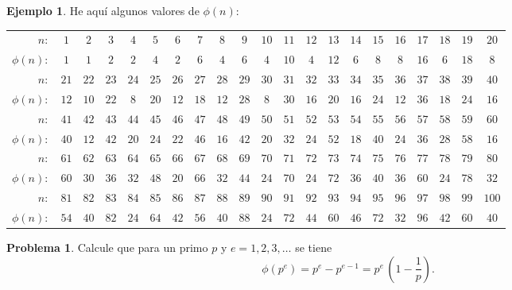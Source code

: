\documentclass{article}
\theoremstyle{definition}
\newtheorem{problema}{Problema}[section]
\newtheorem*{ejemplo}{Ejemplo}
\begin{document}
\begin{ejemplo}
  He aquí algunos valores de $\phi (n)$:

  \begin{center}
    \begin{tabular}{rcccccccccccccccccccc}
      \hline
      $n\colon$ & $1$& $2$& $3$& $4$& $5$& $6$& $7$& $8$& $9$& $10$& $11$& $12$& $13$& $14$& $15$& $16$& $17$& $18$& $19$& $20$ \\
      $\phi(n)\colon$ & $1$& $1$& $2$& $2$& $4$& $2$& $6$& $4$& $6$& $4$& $10$& $4$& $12$& $6$& $8$& $8$& $16$& $6$& $18$& $8$ \\
      \hline
      $n\colon$ & $21$& $22$& $23$& $24$& $25$& $26$& $27$& $28$& $29$& $30$& $31$& $32$& $33$& $34$& $35$& $36$& $37$& $38$& $39$& $40$ \\
      $\phi(n)\colon$ & $12$& $10$& $22$& $8$& $20$& $12$& $18$& $12$& $28$& $8$& $30$& $16$& $20$& $16$& $24$& $12$& $36$& $18$& $24$& $16$ \\
      \hline
      $n\colon$ & $41$& $42$& $43$& $44$& $45$& $46$& $47$& $48$& $49$& $50$& $51$& $52$& $53$& $54$& $55$& $56$& $57$& $58$& $59$& $60$ \\
      $\phi(n)\colon$ & $40$& $12$& $42$& $20$& $24$& $22$& $46$& $16$& $42$& $20$& $32$& $24$& $52$& $18$& $40$& $24$& $36$& $28$& $58$& $16$ \\
      \hline
      $n\colon$ & $61$& $62$& $63$& $64$& $65$& $66$& $67$& $68$& $69$& $70$& $71$& $72$& $73$& $74$& $75$& $76$& $77$& $78$& $79$& $80$ \\
      $\phi(n)\colon$ & $60$& $30$& $36$& $32$& $48$& $20$& $66$& $32$& $44$& $24$& $70$& $24$& $72$& $36$& $40$& $36$& $60$& $24$& $78$& $32$ \\
      \hline
      $n\colon$ & $81$& $82$& $83$& $84$& $85$& $86$& $87$& $88$& $89$& $90$& $91$& $92$& $93$& $94$& $95$& $96$& $97$& $98$& $99$& $100$ \\
      $\phi(n)\colon$ & $54$& $40$& $82$& $24$& $64$& $42$& $56$& $40$& $88$& $24$& $72$& $44$& $60$& $46$& $72$& $32$& $96$& $42$& $60$& $40$ \\
      \hline
    \end{tabular}
  \end{center}
\end{ejemplo}

\begin{problema}
  \label{probl:phi-para-primario}
  Calcule que para un primo $p$ y $e = 1,2,3,\ldots$ se tiene
  $$\phi (p^e) = p^e - p^{e-1} = p^e\,\left(1 - \frac{1}{p}\right).$$
\end{problema}
\end{document}

